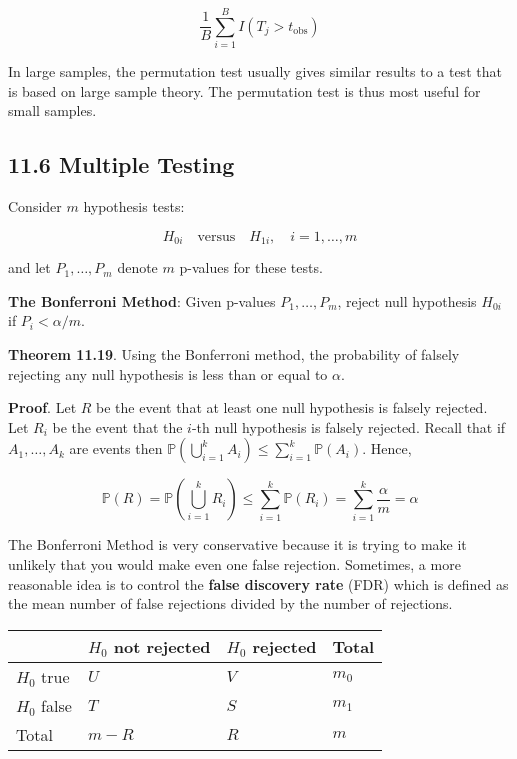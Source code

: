 \[ \frac{1}{B} \sum_{i=1}^B I(T_{j} > t_\text{obs}) \]

In large samples, the permutation test usually gives similar results to
a test that is based on large sample theory. The permutation test is
thus most useful for small samples.

\subsection*{11.6 Multiple Testing}\label{multiple-testing}

Consider \(m\) hypothesis tests:

\[ H_{0i} \quad \text{versus} \quad H_{1i}, \quad i = 1, \dots, m\]

and let \(P_{1}, \dots, P_m\) denote \(m\) p-values for these tests.

\textbf{The Bonferroni Method}: Given p-values \(P_{1}, \dots, P_m\),
reject null hypothesis \(H_{0i}\) if \(P_{i} < \alpha / m\).

\textbf{Theorem 11.19}. Using the Bonferroni method, the probability of
falsely rejecting any null hypothesis is less than or equal to
\(\alpha\).

\textbf{Proof}. Let \(R\) be the event that at least one null hypothesis
is falsely rejected. Let \(R_{i}\) be the event that the \(i\)-th null
hypothesis is falsely rejected. Recall that if \(A_{1}, \dots, A_{k}\) are
events then
\(\mathbb{P} \left( \bigcup_{i=1}^{k} A_{i} \right) \leq \sum_{i=1}^{k} \mathbb{P}(A_{i})\).
Hence,

\[\mathbb{P}(R) = \mathbb{P}\left( \bigcup_{i=1}^{k} R_{i} \right) \leq \sum_{i=1}^{k} \mathbb{P}(R_{i}) = \sum_{i=1}^{k} \frac{\alpha}{m} = \alpha\]

The Bonferroni Method is very conservative because it is trying to make
it unlikely that you would make even one false rejection. Sometimes, a
more reasonable idea is to control the \textbf{false discovery rate}
(FDR) which is defined as the mean number of false rejections divided by
the number of rejections.

\begin{table}[H]
\centering
\begin{tabular}{@{}llll@{}}
\toprule
& \(H_{0}\) not rejected & \(H_{0}\) rejected & Total \\
\midrule
\(H_{0}\) true & \(U\) & \(V\) & \(m_{0}\) \\
\(H_{0}\) false & \(T\) & \(S\) & \(m_{1}\) \\
Total & \(m - R\) & \(R\) & \(m\) \\
\bottomrule
\end{tabular}
\end{table}


